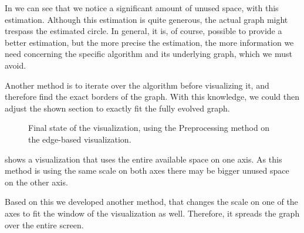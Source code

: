 \documentclass
[
    paper = a4,
    pagesize,
    12 pt,
    twoside,                       %
    open = right,
    DIV = calc,
    BCOR = 0 mm,                   %
    bibtotoc
]
{scrbook}
\begin{document}
In  we can see that we notice a significant amount of unused space, with this estimation.
Although this estimation is quite generous, the actual graph might trespass the estimated circle.
In general, it is, of course, possible to provide a better estimation, but the more precise the estimation, the more information we need concerning the specific algorithm and its underlying graph, which we must avoid.

Another method is to iterate over the algorithm before visualizing it, and therefore find the exact borders of the graph.
With this knowledge, we could then adjust the shown section to exactly fit the fully evolved graph.

\begin{figure}
\caption[]{Final state of the visualization, using the Preprocessing method on the edge-based visualization.}
\label{fig:preprocessing}
\end{figure}

 shows a visualization that uses the entire available space on one axis.
As this method is using the same scale on both axes there may be bigger unused space on the other axis.

Based on this we developed another method, that changes the scale on one of the axes to fit the window of the visualization as well.
Therefore, it spreads the graph over the entire screen.
\end{document}
